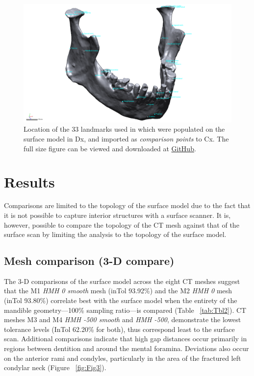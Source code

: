 \documentclass[review]{elsarticle}
\begin{document}
\begin{figure}[ht]\centering
\includegraphics[width=\linewidth]{Fig4}
\caption{Location of the 33 landmarks used in \citet[Supplementary Information]{RN11477} which were populated on the surface model in Dx, and imported as \textit{comparison points} to Cx. The full size figure can be viewed and downloaded at \href{https://github.com/aksel-blaise/cai.mandible/blob/main/figures/Fig4.png}{GitHub}.}
\label{fig:Fig4}
\end{figure}

\section{Results}

Comparisons are limited to the topology of the surface model due to the fact that it is not possible to capture interior structures with a surface scanner. It is, however, possible to compare the topology of the CT mesh against that of the surface scan by limiting the analysis to the topology of the surface model. 

\subsection{Mesh comparison (3-D compare)}

The 3-D comparisons of the surface model across the eight CT meshes suggest that the M1 \textit{HMH 0 smooth} mesh (inTol 93.92\%) and the M2 \textit{HMH 0} mesh (inTol 93.80\%) correlate best with the surface model when the entirety of the mandible geometry---100\% sampling ratio---is compared (Table ~\ref{tab:Tbl2}). CT meshes M3 and M4 \textit{HMH -500 smooth} and \textit{HMH -500}, demonstrate the lowest tolerance levels (InTol 62.20\% for both), thus correspond least to the surface scan. Additional comparisons indicate that high gap distances occur primarily in regions between dentition and around the mental foramina. Deviations also occur on the anterior rami and condyles, particularly in the area of the fractured left condylar neck (Figure ~\ref{fig:Fig3}). 
\end{document}

